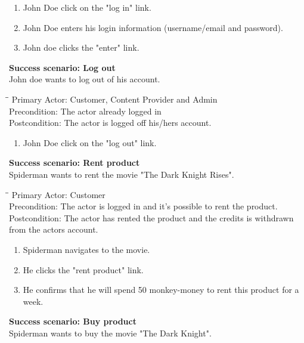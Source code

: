 \begin{enumerate} \setlength{\itemsep}{-1mm}
	\item John Doe click on the "log in" link.
	\item John Doe enters his login information (username/email and password).
	\item John doe clicks the "enter" link.
\end{enumerate}
\vspace{3mm}
\textbf{Success scenario: Log out} \\
John doe wants to log out of his account. 
\begin{tabbing}
\hspace{5mm}\=\hspace{26mm}\=\kill
\>Primary Actor:\> Customer, Content Provider and Admin\\
\>Precondition:\> The actor already logged in\\
\>Postcondition:\> The actor is logged off his/hers account.
\end{tabbing}
\begin{enumerate} \setlength{\itemsep}{-1mm}
	\item John Doe click on the "log out" link.
\end{enumerate}
\vspace{3mm}
\textbf{Success scenario: Rent product} \\
Spiderman wants to rent the movie "The Dark Knight Rises". 
\begin{tabbing}
\hspace{5mm}\=\hspace{26mm}\=\kill
\>Primary Actor:\> Customer\\
\>Precondition:\> The actor is logged in and it's possible to rent the product.\\
\>Postcondition:\> The actor has rented the product and the credits is withdrawn from the actors account.
\end{tabbing}
\begin{enumerate} \setlength{\itemsep}{-1mm}
	\item Spiderman navigates to the movie.
	\item He clicks the "rent product" link.
	\item He confirms that he will spend 50 monkey-money to rent this product for a week.
\end{enumerate}
\vspace{3mm}
\textbf{Success scenario: Buy product} \\
Spiderman wants to buy the movie "The Dark Knight". 
